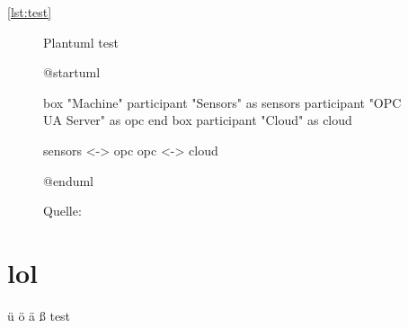 \documentclass[%
    debug           = true,
    auto-generate   = true,
    print-ndn       = true
]{udhbwvst}
\begin{document}


\autoref{lst:test}

\blindtext

\begin{figure}[h]
    \centering
    \caption{Plantuml test}
    \begin{plantuml}
        @startuml

        box "Machine"
            participant "Sensors" as sensors
            participant "OPC UA Server" as opc
        end box
        participant "Cloud" as cloud

        sensors <-> opc
        opc <-> cloud

        @enduml    
    \end{plantuml}
    \caption*{\footnotesize{Quelle: }}
    \label{fig:plantuml_test}
\end{figure}

\section{lol}

ü ö ä ß test
\end{document}
